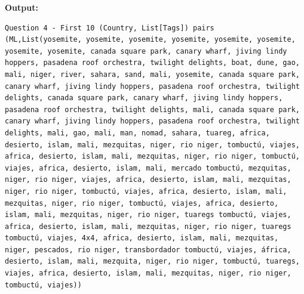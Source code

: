 \documentclass[11pt]{article}
\begin{document}
\textbf{Output:}
\begin{lstlisting}
Question 4 - First 10 (Country, List[Tags]) pairs
(ML,List(yosemite, yosemite, yosemite, yosemite, yosemite, yosemite, yosemite, yosemite, canada square park, canary wharf, jiving lindy hoppers, pasadena roof orchestra, twilight delights, boat, dune, gao, mali, niger, river, sahara, sand, mali, yosemite, canada square park, canary wharf, jiving lindy hoppers, pasadena roof orchestra, twilight delights, canada square park, canary wharf, jiving lindy hoppers, pasadena roof orchestra, twilight delights, mali, canada square park, canary wharf, jiving lindy hoppers, pasadena roof orchestra, twilight delights, mali, gao, mali, man, nomad, sahara, tuareg, africa, desierto, islam, mali, mezquitas, niger, rio niger, tombuctú, viajes, africa, desierto, islam, mali, mezquitas, niger, rio niger, tombuctú, viajes, africa, desierto, islam, mali, mercado tombuctú, mezquitas, niger, rio niger, viajes, africa, desierto, islam, mali, mezquitas, niger, rio niger, tombuctú, viajes, africa, desierto, islam, mali, mezquitas, niger, rio niger, tombuctú, viajes, africa, desierto, islam, mali, mezquitas, niger, rio niger, tuaregs tombuctú, viajes, africa, desierto, islam, mali, mezquitas, niger, rio niger, tuaregs tombuctú, viajes, 4x4, africa, desierto, islam, mali, mezquitas, niger, pescados, rio niger, transbordador tombuctú, viajes, áfrica, desierto, islam, mali, mezquita, niger, rio niger, tombuctú, tuaregs, viajes, africa, desierto, islam, mali, mezquitas, niger, rio niger, tombuctú, viajes))

\end{lstlisting}
\end{document}
